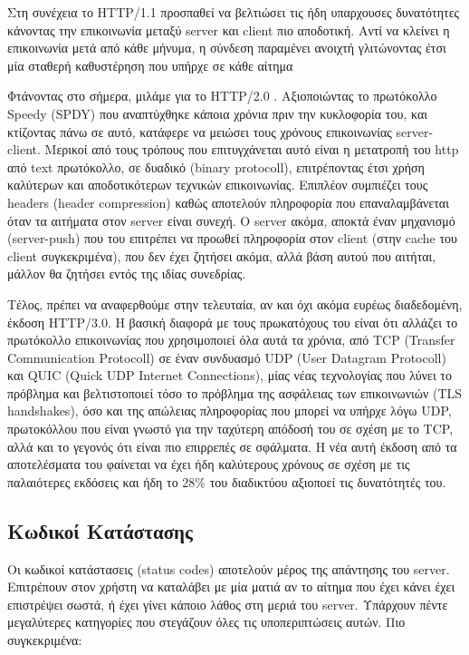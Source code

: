 Στη συνέχεια το HTTP/1.1 προσπαθεί να βελτιώσει τις ήδη υπαρχουσες δυνατότητες κάνοντας την επικοινωνία
μεταξύ server και client πιο αποδοτική. Αντί να κλείνει η επικοινωνία μετά από κάθε μήνυμα, η σύνδεση παραμένει
ανοιχτή γλιτώνοντας έτσι μία σταθερή καθυστέρηση που υπήρχε σε κάθε αίτημα

Φτάνοντας στο σήμερα, μιλάμε για το HTTP/2.0 \cite{http2}. Αξιοποιώντας το πρωτόκολλο Speedy (SPDY) που αναπτύχθηκε κάποια χρόνια πριν
την κυκλοφορία του, και κτίζοντας πάνω σε αυτό, κατάφερε να μειώσει τους χρόνους επικοινωνίας server-client.
Μερικοί από τους τρόπους που επιτυγχάνεται αυτό είναι η μετατροπή του http από text πρωτόκολλο, σε δυαδικό (binary protocoll), επιτρέποντας έτσι χρήση καλύτερων
και αποδοτικότερων τεχνικών επικοινωνίας. Επιπλέον συμπιέζει τους headers (header compression) καθώς αποτελούν πληροφορία που
επαναλαμβάνεται όταν τα αιτήματα στον server είναι συνεχή. Ο server ακόμα, αποκτά έναν μηχανισμό (server-push) που του
επιτρέπει να προωθεί πληροφορία στον client (στην cache του client συγκεκριμένα), που δεν έχει ζητήσει ακόμα, αλλά βάση αυτού
που αιτήται, μάλλον θα ζητήσει εντός της ιδίας συνεδρίας.

Τέλος, πρέπει να αναφερθούμε στην τελευταία, αν και όχι ακόμα ευρέως διαδεδομένη, έκδοση HTTP/3.0. H βασική διαφορά με τους
πρωκατόχους του είναι ότι αλλάζει το πρωτόκολλο επικοινωνίας που χρησιμοποιεί όλα αυτά τα χρόνια, από TCP (Transfer Communication Protocoll) σε
έναν συνδυασμό UDP (User Datagram Protocoll) και QUIC (Quick UDP Internet Connections), μίας νέας τεχνολογίας που λύνει το πρόβλημα και βελτιστοποιεί τόσο το πρόβλημα 
της ασφάλειας των επικοινωνιών (TLS handshakes), όσο και της απώλειας πληροφορίας που μπορεί να υπήρχε λόγω UDP, πρωτοκόλλου που είναι γνωστό
για την ταχύτερη απόδοσή του σε σχέση με το TCP, αλλά και το γεγονός ότι είναι πιο επιρρεπές σε σφάλματα. Η νέα αυτή έκδοση από τα αποτελέσματα 
του \cite{http3} φαίνεται να έχει ήδη καλύτερους χρόνους σε σχέση με τις παλαιότερες εκδόσεις και ήδη το 28\% του διαδικτύου αξιοποεί τις δυνατότητές του. 


\subsection{Κωδικοί Κατάστασης}
\label{subsec:http_status_codes}

Οι κωδικοί κατάστασεις (status codes) αποτελούν μέρος της απάντησης του server. Επιτρέπουν στον χρήστη να καταλάβει με μία ματιά αν το αίτημα που έχει κάνει έχει επιστρέψει σωστά, ή έχει γίνει κάποιο λάθος στη μεριά του server.
Υπάρχουν πέντε μεγαλύτερες κατηγορίες που στεγάζουν όλες τις υποπεριπτώσεις αυτών. Πιο συγκεκριμένα:

